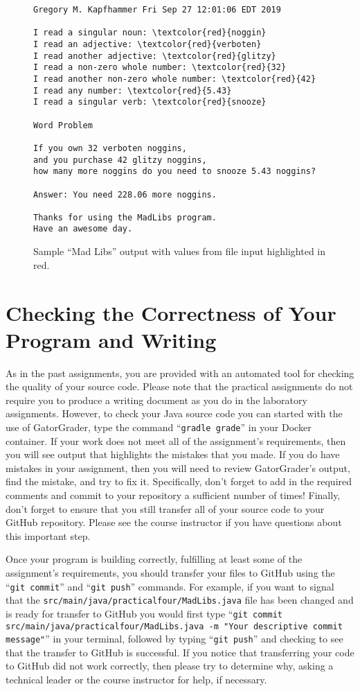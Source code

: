 \documentclass[11pt]{article}
\newcommand{\mainprogramsource}{\lstinline{src/main/java/practicalfour/MadLibs.java}}
\newcommand{\gatorgraderstart}{\command{gradle grade}}
\newcommand{\gitcommit}{\command{git commit}}
\newcommand{\gitpush}{\command{git push}}
\newcommand{\gitcommitmainprogram}{\command{git commit src/main/java/practicalfour/MadLibs.java -m "Your
descriptive commit message"}}
\newcommand{\command}[1]{``\lstinline{#1}''}
\begin{document}
\begin{figure}[tb]
\begin{Verbatim}[commandchars=\\\{\}]
Gregory M. Kapfhammer Fri Sep 27 12:01:06 EDT 2019

I read a singular noun: \textcolor{red}{noggin}
I read an adjective: \textcolor{red}{verboten}
I read another adjective: \textcolor{red}{glitzy}
I read a non-zero whole number: \textcolor{red}{32}
I read another non-zero whole number: \textcolor{red}{42}
I read any number: \textcolor{red}{5.43}
I read a singular verb: \textcolor{red}{snooze}

Word Problem

If you own 32 verboten noggins,
and you purchase 42 glitzy noggins,
how many more noggins do you need to snooze 5.43 noggins?

Answer: You need 228.06 more noggins.

Thanks for using the MadLibs program.
Have an awesome day.
\end{Verbatim}
\vspace*{-.1in}
\caption{Sample ``Mad Libs'' output with values from file input highlighted in red.}
\label{mad}
\end{figure}

\section*{Checking the Correctness of Your Program and Writing}

As in the past assignments, you are provided with an automated tool for checking
the quality of your source code. Please note that the practical assignments do
not require you to produce a writing document as you do in the laboratory
assignments. However, to check your Java source code you can started with the
use of GatorGrader, type the command \gatorgraderstart{} in your Docker
container. If your work does not meet all of the assignment's requirements, then
you will see output that highlights the mistakes that you made. If you do have
mistakes in your assignment, then you will need to review GatorGrader's output,
find the mistake, and try to fix it. Specifically, don't forget to add in the
required comments and commit to your repository a sufficient number of times!
Finally, don't forget to ensure that you still transfer all of your source code
to your GitHub repository. Please see the course instructor if you have
questions about this important step.

Once your program is building correctly, fulfilling at least some of the
assignment's requirements, you should transfer your files to GitHub using the
\gitcommit{} and \gitpush{} commands. For example, if you want to signal that
the \mainprogramsource{} file has been changed and is ready for transfer to
GitHub you would first type \gitcommitmainprogram{} in your terminal, followed
by typing \gitpush{} and checking to see that the transfer to GitHub is
successful. If you notice that transferring your code to GitHub did not work
correctly, then please try to determine why, asking a technical leader or the
course instructor for help, if necessary.
\end{document}
